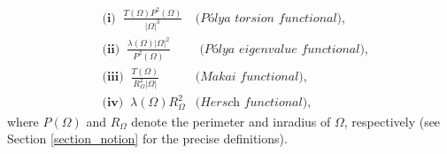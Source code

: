\documentclass[oneside,a4paper,11pt,notitlepage]{article}
\newcommand{\abs}[1]{{\left|#1\right|}}
\theoremstyle{definition}
\theoremstyle{plain}
\theoremstyle{definition}
\newcommand{\BBB}{\color{black}}
\newcommand{\VVV}{\color{verde}}
\begin{document}
\begin{equation}
\label{eq:functionals}
    \begin{aligned}
    &\textbf{(i)}\;\;\displaystyle{ \frac{T(\Omega) P^2(\Omega)}{\abs{\Omega}^3}}  & \textit{(P\'olya torsion  functional)},\\ & \textbf{(ii)}\;\;\frac{\lambda( \Omega) \abs{\Omega}^2}{P^2(\Omega)}  & \textit{ (P\'olya eigenvalue  functional)}, \\
    &\textbf{(iii)}\;\;  \frac{T(\Omega)}{R_{\Omega}^2\abs{\Omega}} & \textit{(Makai functional)},  \\
    &\textbf{(iv)}\;\;\lambda( \Omega)R^2_\Omega & \textit{(Hersch functional)},
    \end{aligned}
\end{equation}
where $P(\Omega)$ and $R_\Omega$ denote the perimeter and  inradius of $\Omega$,  respectively (see Section \ref{section_notion} for the precise definitions).  

\end{document}
